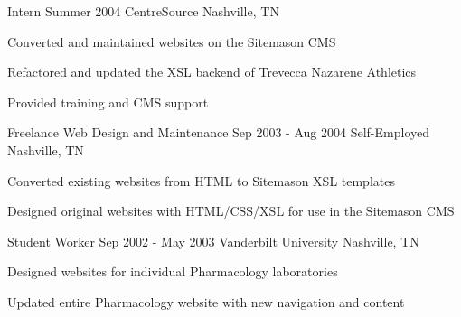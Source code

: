 {\begin{cventries}
  \cventry
  {Intern}
  {Summer 2004}
  {CentreSource}
  {Nashville, TN}
  {
    \begin{cvitems}
      \item Converted and maintained websites on the Sitemason CMS
      \item Refactored and updated the XSL backend of Trevecca Nazarene Athletics
      \item Provided training and CMS support
    \end{cvitems}
    \cvtags{
      \tagCSS
      \tagHTML
      \tagJavaScript
      \tagXML
      \tagXSLT
    }
  }

  \cventry
  {Freelance Web Design and Maintenance}
  {Sep 2003 - Aug 2004}
  {Self-Employed}
  {Nashville, TN}
  {
    \begin{cvitems}
      \item Converted existing websites from HTML to Sitemason XSL templates
      \item Designed original websites with HTML/CSS/XSL for use in the Sitemason CMS
    \end{cvitems}
    \cvtags{
      \tagCSS
      \tagHTML
      \tagJavaScript
      \tagXML
      \tagXSLT
      \tagProjectManagement
    }
  }

  \cventry
  {Student Worker}
  {Sep 2002 - May 2003}
  {Vanderbilt University}
  {Nashville, TN}
  {
    \begin{cvitems}
      \item Designed websites for individual Pharmacology laboratories
      \item Updated entire Pharmacology website with new navigation and content
    \end{cvitems}
    \cvtags{
      \tagCSS
      \tagHTML
      \tagJavaScript
      \tagDreamweaver
      \tagPhotoshop
    }
  }
\end{cventries}
}{}
